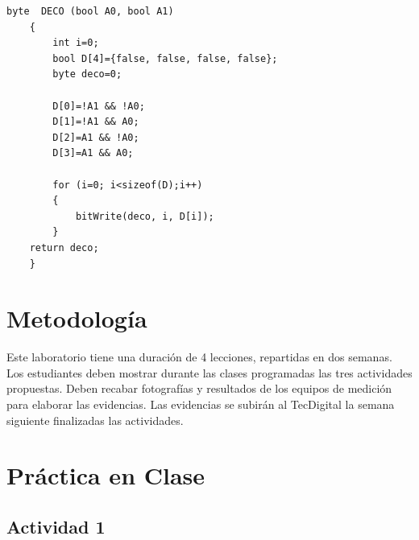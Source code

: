 \begin{lstlisting}[language=Arduino,numbers=none, showstringspaces=false]
	byte  DECO (bool A0, bool A1)
	{
		int i=0;
		bool D[4]={false, false, false, false};
		byte deco=0;
	
		D[0]=!A1 && !A0;
		D[1]=!A1 && A0;
		D[2]=A1 && !A0;
		D[3]=A1 && A0;
	
		for (i=0; i<sizeof(D);i++)
		{
			bitWrite(deco, i, D[i]);
		}
	return deco;
	}
\end{lstlisting}
  
\section{Metodología}

Este laboratorio tiene una duración de 4 lecciones, repartidas en dos semanas. Los estudiantes deben mostrar durante las clases programadas las tres actividades propuestas. Deben recabar fotografías y resultados de los equipos de medición para elaborar las evidencias. Las evidencias se subirán al TecDigital la semana siguiente finalizadas las actividades.

\section{Práctica en Clase}

\subsection{Actividad 1}

